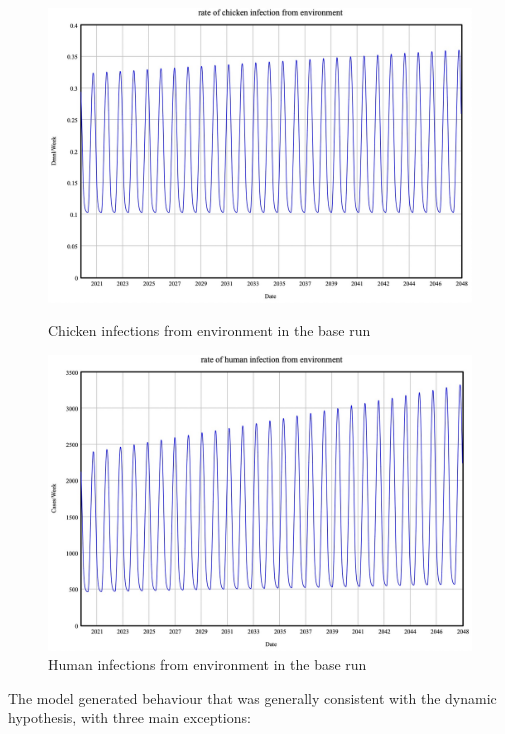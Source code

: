 \begin{figure}[h!]
    \centering
    \begin{minipage}{0.45\textwidth}
        \centering
        \includegraphics[width=1\textwidth]{images/base_chicken.jpeg} 
        \caption{Chicken infections from environment in the base run}
        \label{fig:b_chicken}
    \end{minipage}\hfill
    \begin{minipage}{0.45\textwidth}
        \centering
        \includegraphics[width=1\textwidth]{images/base_human.jpeg}
        \caption{Human infections from environment in the base run}
        \label{fig:b_human}
    \end{minipage}
\end{figure}

The model generated behaviour that was generally consistent with the dynamic hypothesis, with three main exceptions:

